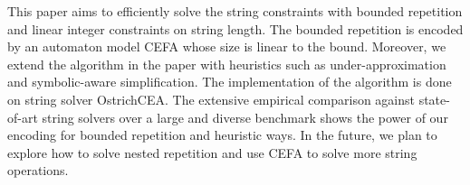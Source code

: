%

This paper aims to efficiently solve the string constraints with bounded repetition and linear integer constraints on string length. The bounded repetition is encoded by an automaton model CEFA whose size is linear to the bound. Moreover, we extend the algorithm in the paper \cite{atva2020} with heuristics such as under-approximation and symbolic-aware simplification. The implementation of the algorithm is done on string solver OstrichCEA. The extensive empirical comparison against state-of-art string solvers over a large and diverse benchmark shows the power of our encoding for bounded repetition and heuristic ways. In the future, we plan to explore how to solve nested repetition and use CEFA to solve more string operations.



%